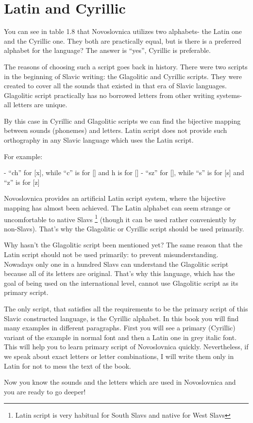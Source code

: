 \section{Latin and Cyrillic}

You can see in table 1.8 that Novoslovnica utilizes two alphabets- the Latin one and the Cyrillic one. They both are practically equal, but is there is a preferred alphabet for the language? The answer is “yes”, Cyrillic is preferable.

The reasons of choosing such a script goes back in history. There were two scripts in the beginning of Slavic writing: the Glagolitic and Cyrillic scripts. They were created to cover all the sounds that existed in that era of Slavic languages. Glagolitic script practically has no borrowed letters from other writing systems- all letters are unique.

By this case in Cyrillic and Glagolitic scripts we can find the bijective mapping between sounds (phonemes) and letters. Latin script does not provide such orthography in any Slavic language which uses the Latin script. 

For example:

- “ch” for [x], while “c” is for [] and h is for []
- “sz” for [], while “s” is for [s] and “z” is for [z]

Novoslovnica provides an artificial Latin script system, where the bijective mapping has almost been achieved. The Latin alphabet can seem strange or uncomfortable to native Slavs \footnote{Latin script is very habitual for South Slavs and native for West Slavs} (though it can be used rather conveniently by non-Slavs). That’s why the Glagolitic or Cyrillic script should be used primarily.


Why hasn’t the Glagolitic script been mentioned yet? The same reason that the Latin script should not be used primarily: to prevent misunderstanding. Nowadays only one in a hundred Slavs can understand the Glagolitic script because all of its letters are original. That’s why this language, which has the goal of being used on the international level, cannot use Glagolitic script as its primary script.

The only script, that satisfies all the requirements to be the primary script of this Slavic constructed language, is the Cyrillic alphabet. In this book you will find many examples in different paragraphs. First you will see a primary (Cyrillic) variant of the example in normal font and then a Latin one in grey italic font. This will help you to learn primary script of Novoslovnica quickly. Nevertheless, if we speak about exact letters or letter combinations, I will write them only in Latin for not to mess the text of the book.

Now you know the sounds and the letters which are used in Novoslovnica and you are ready to go deeper!
